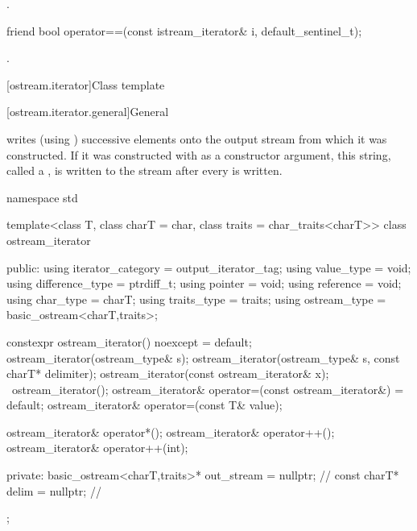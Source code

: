 \begin{itemdescr}
\pnum
\returns
{}.
\end{itemdescr}

%
\begin{itemdecl}
friend bool operator==(const istream_iterator& i, default_sentinel_t);
\end{itemdecl}

\begin{itemdescr}
\pnum
\returns
{}.
\end{itemdescr}

[ostream.iterator]{Class template }

[ostream.iterator.general]{General}

\pnum
{}%
writes (using
)
successive elements onto the output stream from which it was constructed.
If it was constructed with
as a constructor argument, this string, called a
,
is written to the stream after every
is written.

\begin{codeblock}
namespace std {
  template<class T, class charT = char, class traits = char_traits<charT>>
  class ostream_iterator {
  public:
    using iterator_category = output_iterator_tag;
    using value_type        = void;
    using difference_type   = ptrdiff_t;
    using pointer           = void;
    using reference         = void;
    using char_type         = charT;
    using traits_type       = traits;
    using ostream_type      = basic_ostream<charT,traits>;

    constexpr ostream_iterator() noexcept = default;
    ostream_iterator(ostream_type& s);
    ostream_iterator(ostream_type& s, const charT* delimiter);
    ostream_iterator(const ostream_iterator& x);
    ~ostream_iterator();
    ostream_iterator& operator=(const ostream_iterator&) = default;
    ostream_iterator& operator=(const T& value);

    ostream_iterator& operator*();
    ostream_iterator& operator++();
    ostream_iterator& operator++(int);

  private:
    basic_ostream<charT,traits>* out_stream = nullptr;          // \expos
    const charT* delim = nullptr;                               // \expos
  };
}
\end{codeblock}

